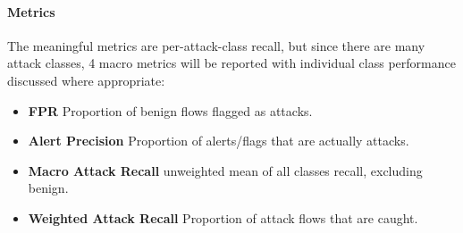 \documentclass{article}
\begin{document}
\paragraph{Metrics}
The meaningful metrics are per-attack-class recall, but since there are many attack classes, 4 macro metrics will be reported with individual class performance discussed where appropriate:
\begin{itemize}
    \item \textbf{FPR} Proportion of benign flows flagged as attacks.
    \item \textbf{Alert Precision} Proportion of alerts/flags that are actually attacks.
    \item \textbf{Macro Attack Recall} unweighted mean of all classes recall, excluding benign.
    \item \textbf{Weighted Attack Recall} Proportion of attack flows that are caught.
\end{itemize}
\begin{table}[H]
\centering
{}
\caption{Imbalance techniques: Baseline (none) vs. Sample Weights vs. Under-Sampling vs. Over-Sampling vs. Over-Under synthesis, with XGBoost, common hyper-parameters, same train and test set, resampling fit on train only.} 
\end{table}
\end{document}
